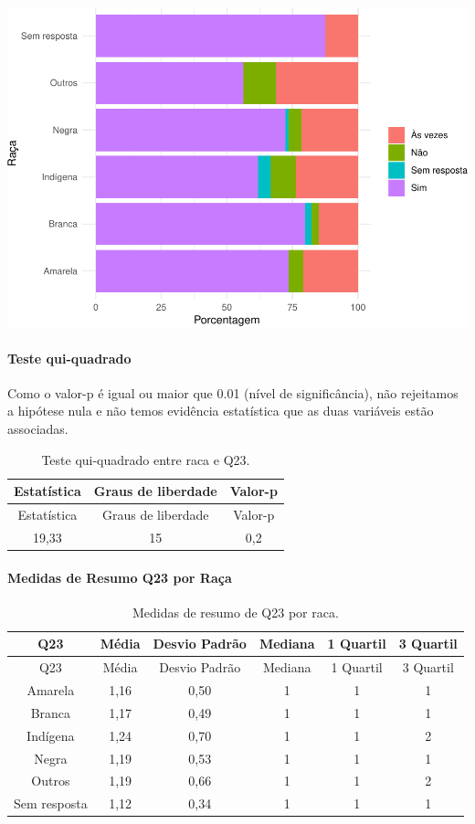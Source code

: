 \documentclass[]{article}
\let\oldparagraph\paragraph
\renewcommand{\paragraph}[1]{\oldparagraph{#1}\mbox{}}
\begin{document}
\begin{center}\includegraphics[width=0.75\linewidth]{relatorio_covid19_files/figure-latex/unnamed-chunk-574-1} \end{center}

\hypertarget{teste-qui-quadrado-50}{%
\paragraph{Teste qui-quadrado}\label{teste-qui-quadrado-50}}

Como o valor-p é igual ou maior que 0.01 (nível de significância), não rejeitamos a hipótese nula e não temos evidência estatística que as duas variáveis estão associadas.

\begin{longtable}[]{@{}ccc@{}}
\caption{\label{tab:unnamed-chunk-576}Teste qui-quadrado entre raca e Q23.}\tabularnewline
\toprule
Estatística & Graus de liberdade & Valor-p\tabularnewline
\midrule
\endfirsthead
\toprule
Estatística & Graus de liberdade & Valor-p\tabularnewline
\midrule
\endhead
19,33 & 15 & 0,2\tabularnewline
\bottomrule
\end{longtable}

\cleardoublepage

\hypertarget{medidas-de-resumo-q23-por-rauxe7a}{%
\paragraph{Medidas de Resumo Q23 por Raça}\label{medidas-de-resumo-q23-por-rauxe7a}}

\begin{longtable}[]{@{}cccccc@{}}
\caption{\label{tab:unnamed-chunk-577}Medidas de resumo de Q23 por raca.}\tabularnewline
\toprule
Q23 & Média & Desvio Padrão & Mediana & 1 Quartil & 3 Quartil\tabularnewline
\midrule
\endfirsthead
\toprule
Q23 & Média & Desvio Padrão & Mediana & 1 Quartil & 3 Quartil\tabularnewline
\midrule
\endhead
Amarela & 1,16 & 0,50 & 1 & 1 & 1\tabularnewline
Branca & 1,17 & 0,49 & 1 & 1 & 1\tabularnewline
Indígena & 1,24 & 0,70 & 1 & 1 & 2\tabularnewline
Negra & 1,19 & 0,53 & 1 & 1 & 1\tabularnewline
Outros & 1,19 & 0,66 & 1 & 1 & 2\tabularnewline
Sem resposta & 1,12 & 0,34 & 1 & 1 & 1\tabularnewline
\bottomrule
\end{longtable}
\end{document}
